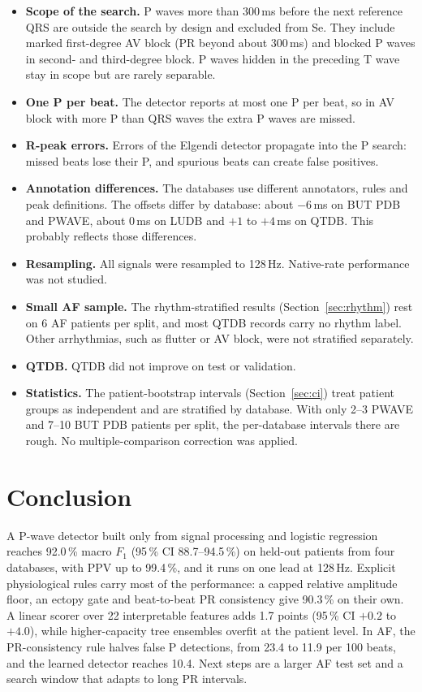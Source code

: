 \documentclass[11pt,a4paper]{article}
\begin{document}
\begin{itemize}
\item \textbf{Scope of the search.} P waves more than 300\,ms before the next reference QRS are outside the search by design and excluded from Se. They include marked first-degree AV block (PR beyond about 300\,ms) and blocked P waves in second- and third-degree block. P waves hidden in the preceding T wave stay in scope but are rarely separable.
\item \textbf{One P per beat.} The detector reports at most one P per beat, so in AV block with more P than QRS waves the extra P waves are missed.
\item \textbf{R-peak errors.} Errors of the Elgendi detector propagate into the P search: missed beats lose their P, and spurious beats can create false positives.
\item \textbf{Annotation differences.} The databases use different annotators, rules and peak definitions. The offsets differ by database: about $-6$\,ms on BUT PDB and PWAVE, about 0\,ms on LUDB and $+1$ to $+4$\,ms on QTDB. This probably reflects those differences.
\item \textbf{Resampling.} All signals were resampled to 128\,Hz. Native-rate performance was not studied.
\item \textbf{Small AF sample.} The rhythm-stratified results (Section~\ref{sec:rhythm}) rest on 6 AF patients per split, and most QTDB records carry no rhythm label. Other arrhythmias, such as flutter or AV block, were not stratified separately.
\item \textbf{QTDB.} QTDB did not improve on test or validation.
\item \textbf{Statistics.} The patient-bootstrap intervals (Section~\ref{sec:ci}) treat patient groups as independent and are stratified by database. With only 2--3 PWAVE and 7--10 BUT PDB patients per split, the per-database intervals there are rough. No multiple-comparison correction was applied.
\end{itemize}

\section{Conclusion}

A P-wave detector built only from signal processing and logistic regression reaches 92.0\,\% macro $F_1$ (95\,\% CI 88.7--94.5\,\%) on held-out patients from four databases, with PPV up to 99.4\,\%, and it runs on one lead at 128\,Hz. Explicit physiological rules carry most of the performance: a capped relative amplitude floor, an ectopy gate and beat-to-beat PR consistency give 90.3\,\% on their own. A linear scorer over 22 interpretable features adds 1.7 points (95\,\% CI $+0.2$ to $+4.0$), while higher-capacity tree ensembles overfit at the patient level. In AF, the PR-consistency rule halves false P detections, from 23.4 to 11.9 per 100 beats, and the learned detector reaches 10.4. Next steps are a larger AF test set and a search window that adapts to long PR intervals.
\end{document}

